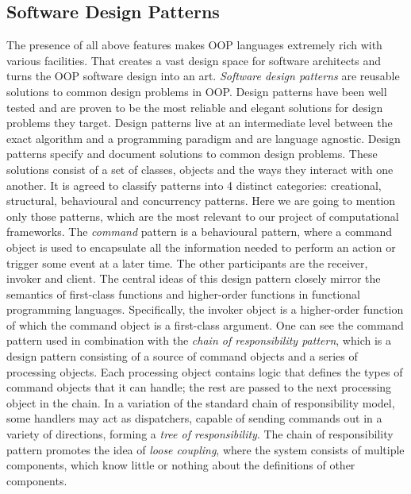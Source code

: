 \subsection{Software Design Patterns}
\label{background_design}
\quad The presence of all above features makes OOP languages extremely rich with various facilities. That creates a vast design space for software architects and turns the OOP software design into an art. \textit{Software design patterns} \cite{gang-of-four} are reusable solutions to common design problems in OOP. Design patterns have been well tested and are proven to be the most reliable and elegant solutions for design problems they target.\newline\null
\quad Design patterns live at an intermediate level between the exact algorithm and a programming paradigm and are language agnostic. Design patterns specify and document solutions to common design problems. These solutions consist of a set of classes, objects and the ways they interact with one another. It is agreed to classify patterns into 4 distinct categories: creational, structural, behavioural and concurrency patterns. Here we are going to mention only those patterns, which are the most relevant to our project of computational frameworks.\newline\null
\quad The \textit{command} pattern is a behavioural pattern, where a command object is used to encapsulate all the information needed to perform an action or trigger some event at a later time. The other participants are the receiver, invoker and client. The central ideas of this design pattern closely mirror the semantics of first-class functions and higher-order functions in functional programming languages. Specifically, the invoker object is a higher-order function of which the command object is a first-class argument.\newline\null
\quad One can see the command pattern used in combination with the \textit{chain of responsibility pattern}, which is a design pattern consisting of a source of command objects and a series of processing objects. Each processing object contains logic that defines the types of command objects that it can handle; the rest are passed to the next processing object in the chain. In a variation of the standard chain of responsibility model, some handlers may act as dispatchers, capable of sending commands out in a variety of directions, forming a \textit{tree of responsibility}. The chain of responsibility pattern promotes the idea of \textit{loose coupling}, where the system consists of multiple components, which know little or nothing about the definitions of other components.\newline\null
